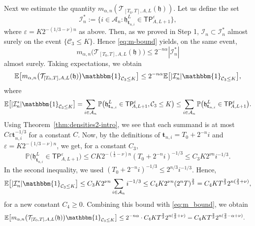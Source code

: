 \documentclass[oneside,final,11pt]{amsart}
\theoremstyle{definition}
\newcommand{\fh}{\mathfrak{h}}
\newcommand{\TP}[1]{\mathsf{TP}_{\!\!#1}}
\newcommand{\CT}{\mathcal{T}}
\newcommand{\CC}{\mathcal{C}}
\newcommand{\1}[1]{\mathbf{1}_{#1}}
\newcommand{\eps}{\varepsilon}
\renewcommand{\epsilon}{\varepsilon}
\newcommand{\E}{\mathbb E}
\newcommand{\one}{\mathbbm{1}}
\newcommand{\ic}[1]{\marginnote{\tiny{\color{green!65!black}[IC: #1]}}}
\newcommand{\ft}{\mathbf{t}}
\newcommand{\CI}{\mathcal{I}}
\newcommand{\CA}{\mathcal{A}}
\renewcommand{\P}{\mathbb P}
\numberwithin{equation}{section}
\begin{document}
Next we estimate the quantity $m_{\alpha, n}(\CT_{[T_0, T], A, L}(\fh))$. Let us define the set
%
$$\CI^*_n := \bigl\{i \in \CA_n : \fh^L_{\ft_{n,i}} \in \TP{A, L + 1}^{\eps}\bigr\},$$
%
where $\eps = K 2^{-(1 / 3-\nu)n}$ as above. Then, as we proved in Step 1, $\CI_n \subset \CI^*_n$ almost surely on the event $\{\CC_3 \leq K\}$. Hence \eqref{eq:m-bound} yields, on the same event,
%
\begin{equation}
m_{\alpha, n}\bigl(\CT_{[T_0, T], A, L}(\fh)\bigr) \leq 2^{-n\alpha}|\CI^*_n|
\end{equation}
%
almost surely. Taking expectations, we obtain
%
\begin{equation}\label{eq:m_bound}
\E\bigl[m_{\alpha, n}\bigl(\CT_{[T_0, T], A, L}(\fh)\bigr)\one_{\CC_3 \leq K}\bigr] \leq 2^{-n\alpha} \E\bigl[|\CI^*_n|\one_{\CC_3\leq K}\bigr],
\end{equation}
%
where
%
\begin{equation}
\E\bigl[|\CI^*_n|\one_{\CC_3\leq K}\bigr] = \sum_{i \in \CA_n} \P \bigl( \fh^L_{\ft_{n,i}} \in \TP{A, L + 1}^{\eps}, \CC_3\leq K\bigr) \leq \sum_{i \in \CA_n} \P \bigl( \fh^L_{\ft_{n,i}} \in \TP{A, L + 1}^{\eps}\bigr).
\end{equation}
%
 Using Theorem~\ref{thm:densities2-intro}, we see that each summand is at most $C \epsilon \ft_{n,i}^{-1/3}$ for a constant $C$. Now, by the definitions of $\ft_{n,i} =T_0+ 2^{-n} i$
 and $\eps= K 2^{-(1 / 3-\nu)n}$, we get, for a constant $C_3$,
 $$\P\bigl(\fh^L_{\ft_{n,i}} \in \TP{A, L + 1}^{\eps}\bigr) \leq C  K 2^{-(\frac{1}{3}-\nu)n} (T_0+2^{-n} i)^{-1/3} \leq C_3K 2^{\nu n} i^{-1/3}.$$
 In the second inequality, we used  $(T_0+2^{-n}i)^{-1/3} \leq 2^{n/3} i^{-1/3}$.  Hence,
%
\begin{equation}
\E\bigl[|\CI^*_n|\one_{\CC_3\leq K}\bigr]  \leq C_3 K2^{\nu n} \sum_{i \in \CA_n} i^{-1/3} \leq C_4 K2^{\nu n} (2^n T)^{\frac{2}{3}} = C_4 KT^{\frac{2}{3}} 2^{n(\frac{2}{3} + \nu)},
\end{equation}
%
for a new constant $C_4 \geq 0$. Combining this bound with \eqref{eq:m_bound}, we obtain
%
\begin{align}
\E\bigl[m_{\alpha, n}\bigl(\CT_{[T_0, T], A, L}(\fh)\bigr)\one_{\CC_3 \leq K}\bigr] &\leq 2^{-n\alpha}\cdot C_4 KT^{\frac{2}{3}}  2^{n(\frac{2}{3} + \nu)}
%
= C_4 KT^{\frac{2}{3}} 2^{n (\frac{2}{3}-\alpha + \nu)}.
\end{align}
\end{document}
